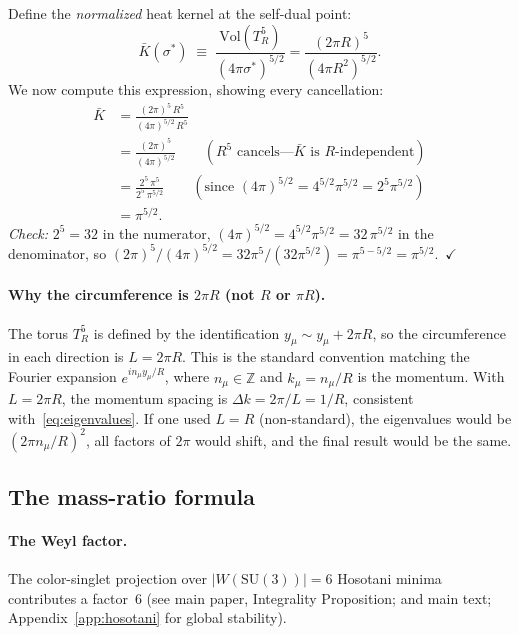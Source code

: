 Define the \emph{normalized} heat kernel at the self-dual point:
\begin{equation}\label{eq:kbar}
  \bar{K}(\sigma^*)
  \;\equiv\; \frac{\mathrm{Vol}(T^5_R)}{(4\pi\sigma^*)^{5/2}}
  = \frac{(2\pi R)^5}{(4\pi R^2)^{5/2}}.
\end{equation}
We now compute this expression, showing every cancellation:
\begin{align}
  \bar{K}
  &= \frac{(2\pi)^5\,R^5}{(4\pi)^{5/2}\,R^5}
    \label{eq:step1}\\[4pt]
  &= \frac{(2\pi)^5}{(4\pi)^{5/2}}
    \qquad(\text{$R^5$ cancels---$\bar{K}$ is $R$-independent})
    \label{eq:step2}\\[4pt]
  &= \frac{2^5\,\pi^5}{2^5\,\pi^{5/2}}
    \qquad(\text{since }(4\pi)^{5/2}=4^{5/2}\pi^{5/2}=2^5\pi^{5/2})
    \label{eq:step3}\\[4pt]
  &= \pi^{5/2}.
    \label{eq:kbar_result}
\end{align}
\emph{Check:} $2^5=32$ in the numerator, $(4\pi)^{5/2}=4^{5/2}\pi^{5/2}
=32\,\pi^{5/2}$ in the denominator, so $(2\pi)^5/(4\pi)^{5/2}
=32\pi^5/(32\pi^{5/2})=\pi^{5-5/2}=\pi^{5/2}$.~$\checkmark$

\paragraph{Why the circumference is $2\pi R$ (not $R$ or $\pi R$).}
The torus $T^5_R$ is defined by the identification
$y_\mu\sim y_\mu+2\pi R$, so the circumference in each direction
is $L=2\pi R$. This is the standard convention matching the Fourier
expansion $e^{in_\mu y_\mu/R}$, where $n_\mu\in\mathbb{Z}$ and
$k_\mu=n_\mu/R$ is the momentum. With $L=2\pi R$, the momentum
spacing is $\Delta k=2\pi/L=1/R$, consistent with~\eqref{eq:eigenvalues}.
If one used $L=R$ (non-standard), the eigenvalues would be
$(2\pi n_\mu/R)^2$, all factors of $2\pi$ would shift, and the final
result would be the same.

\subsection{The mass-ratio formula}

\paragraph{The Weyl factor.}
The color-singlet projection over $|W(\mathrm{SU}(3))|=6$ Hosotani
minima contributes a factor~6 (see main paper, Integrality Proposition; and
main text; Appendix~\ref{app:hosotani} for global stability).

